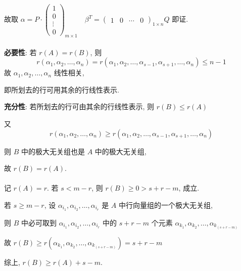 		 故取 \( \alpha = P \cdot \begin{pmatrix}
			 1      \\
			 0      \\
			 \vdots \\
			 0
		 \end{pmatrix}_{m \times 1} \quad \beta^{T} = \begin{pmatrix}
			 1 & 0 & \cdots & 0
		 \end{pmatrix}_{1 \times n} Q \) 即证.


	 \paragraph{} %
		 \textbf{必要性}: 若 \( r(A) = r(B) \), 则
		 \[ r(\alpha_{1}, \alpha_{2}, \dots, \alpha_{n}) = r(\alpha_{1}, \alpha_{2}, \dots, \alpha_{s-1}, \alpha_{s+1}, \dots, \alpha_{n}) \leq n-1 \]
		 故 \( \alpha_{1}, \alpha_{2}, \dots, \alpha_{n} \) 线性相关,

		 即所划去的行可用其余的行线性表示.

		 \textbf{充分性}: 若所划去的行可由其余的行线性表示, 则 \( r(B) \leq r(A) \)

		 又 \[ r(\alpha_{1}, \alpha_{2}, \dots, \alpha_{n}) \geq r(\alpha_{1}, \alpha_{2}, \dots, \alpha_{s-1}, \alpha_{s+1}, \dots, \alpha_{n}) \]

		 则 \( B \) 中的极大无关组也是 \( A \) 中的极大无关组,

		 故 \( r(B) = r(A) \).


	 \paragraph{} %
		 记 \( r(A) = r \). 若 \( s < m-r \), 则 \( r(B) \geq 0 > s+r-m \), 成立.

		 若 \( s \geq m-r \), 设 \( \alpha_{i_{1}}, \alpha_{i_{2}}, \dots, \alpha_{i_{r}} \) 是 \( A \) 中行向量组的一个极大无关组,

		 则 \( B \) 中必可取到 \( \alpha_{i_{1}}, \alpha_{i_{2}}, \dots, \alpha_{i_{r}} \) 中的 \( s+r-m \) 个元素 \( \alpha_{k_{1}}, \alpha_{k_{2}}, \dots, \alpha_{k_{(s+r-m)}} \)

		 故 \( r(B) \geq r(\alpha_{k_{1}}, \alpha_{k_{2}}, \dots, \alpha_{k_{(s+r-m)}}) = s+r-m \)

		 综上, \( r(B) \geq r(A) + s - m \).


 \subsection{} %


